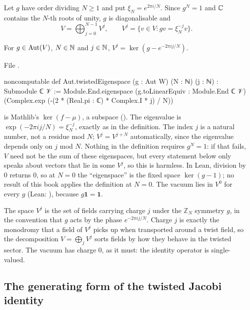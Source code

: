 Let $g$ have order dividing $N\ge1$ and put $\xi_N=e^{2\pi i/N}$.  Since $g^N=1$ and ${\mathbb{C}}$ contains
the $N$-th roots of unity, $g$ is diagonalisable and
\begin{equation*}
  V=\bigoplus_{j=0}^{N-1}V^j,\qquad V^j=\{v\in V : gv=\xi_N^{-j}v\}.
\end{equation*}
\begin{definition}\label{ch06:def:eigen}
For $g\in\operatorname{Aut}(V)$, $N\in{\mathbb{N}}$ and $j\in{\mathbb{N}}$, $V^j=\ker(g-e^{-2\pi i j/N})$.
\end{definition}
\noindent File .
\begin{leancode}
noncomputable def Aut.twistedEigenspace (g : Aut W) (N : ℕ) (j : ℕ) : Submodule ℂ 𝒱 :=
  Module.End.eigenspace (g.toLinearEquiv : Module.End ℂ 𝒱)
    (Complex.exp (-(2 * (Real.pi : ℂ) * Complex.I * j) / N))
\end{leancode}
\begin{dictionary}
 is Mathlib's $\ker(f-\mu)$, a subspace ().
The eigenvalue is $\exp(-2\pi i j/N)=\xi_N^{-j}$, exactly as in the definition.  The index $j$ is a
natural number, not a residue mod $N$; $V^j=V^{j+N}$ automatically, since the eigenvalue depends
only on $j$ mod $N$.  Nothing in the definition requires $g^N=1$: if that fails, $V$ need not be the
sum of these eigenspaces, but every statement below only speaks about vectors that lie in some
$V^j$, so this is harmless.  In Lean, division by $0$ returns $0$, so at $N=0$ the ``eigenspace'' is
the fixed space $\ker(g-1)$; no result of this book applies the definition at $N=0$.  The vacuum lies
in $V^0$ for every $g$ (Lean: ), because $g\mathbf
1=\mathbf 1$.
\end{dictionary}

\begin{physics}
The space $V^j$ is the set of fields carrying charge $j$ under the $\mathbb Z_N$ symmetry $g$, in the convention that $g$ acts by the phase $e^{-2\pi i j/N}$. Charge $j$ is exactly the monodromy that a field of $V^j$ picks up when transported around a twist field, so the decomposition $V=\bigoplus_jV^j$ sorts fields by how they behave in the twisted sector. The vacuum has charge $0$, as it must: the identity operator is single-valued.
\end{physics}

\subsection{The generating form of the twisted Jacobi identity}

